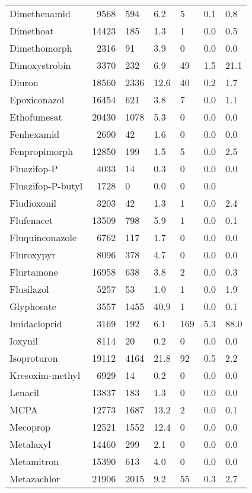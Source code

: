 \begin{longtable}{p{3cm}rR{1.4cm}R{1.4cm}R{1.4cm}R{1.4cm}R{1.4cm}}
  Dimethenamid & 9568 & 594 & 6.2 &  5 & 0.1 & 0.8 \\ 
  Dimethoat & 14423 & 185 & 1.3 &  1 & 0.0 & 0.5 \\ 
  Dimethomorph & 2316 & 91 & 3.9 &  0 & 0.0 & 0.0 \\ 
  Dimoxystrobin & 3370 & 232 & 6.9 & 49 & 1.5 & 21.1 \\ 
  Diuron & 18560 & 2336 & 12.6 & 40 & 0.2 & 1.7 \\ 
  Epoxiconazol & 16454 & 621 & 3.8 &  7 & 0.0 & 1.1 \\ 
  Ethofumesat & 20430 & 1078 & 5.3 &  0 & 0.0 & 0.0 \\ 
  Fenhexamid & 2690 & 42 & 1.6 &  0 & 0.0 & 0.0 \\ 
  Fenpropimorph & 12850 & 199 & 1.5 &  5 & 0.0 & 2.5 \\ 
  Fluazifop-P & 4033 & 14 & 0.3 &  0 & 0.0 & 0.0 \\ 
  Fluazifop-P-butyl & 1728 &  0 & 0.0 &  0 & 0.0 &  \\ 
  Fludioxonil & 3203 & 42 & 1.3 &  1 & 0.0 & 2.4 \\ 
  Flufenacet & 13509 & 798 & 5.9 &  1 & 0.0 & 0.1 \\ 
  Fluquinconazole & 6762 & 117 & 1.7 &  0 & 0.0 & 0.0 \\ 
  Fluroxypyr & 8096 & 378 & 4.7 &  0 & 0.0 & 0.0 \\ 
  Flurtamone & 16958 & 638 & 3.8 &  2 & 0.0 & 0.3 \\ 
  Flusilazol & 5257 & 53 & 1.0 &  1 & 0.0 & 1.9 \\ 
  Glyphosate & 3557 & 1455 & 40.9 &  1 & 0.0 & 0.1 \\ 
  Imidacloprid & 3169 & 192 & 6.1 & 169 & 5.3 & 88.0 \\ 
  Ioxynil & 8114 & 20 & 0.2 &  0 & 0.0 & 0.0 \\ 
  Isoproturon & 19112 & 4164 & 21.8 & 92 & 0.5 & 2.2 \\ 
  Kresoxim-methyl & 6929 & 14 & 0.2 &  0 & 0.0 & 0.0 \\ 
  Lenacil & 13837 & 183 & 1.3 &  0 & 0.0 & 0.0 \\ 
  MCPA & 12773 & 1687 & 13.2 &  2 & 0.0 & 0.1 \\ 
  Mecoprop & 12521 & 1552 & 12.4 &  0 & 0.0 & 0.0 \\ 
  Metalaxyl & 14460 & 299 & 2.1 &  0 & 0.0 & 0.0 \\ 
  Metamitron & 15390 & 613 & 4.0 &  0 & 0.0 & 0.0 \\ 
  Metazachlor & 21906 & 2015 & 9.2 & 55 & 0.3 & 2.7 \\ 

\end{longtable}
